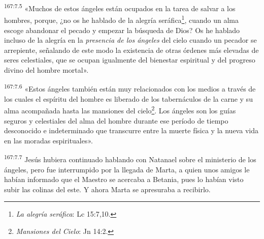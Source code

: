 \par
\textsuperscript{167:7.5} «Muchos de estos ángeles están ocupados en la tarea de salvar a los hombres, porque, ¿no os he hablado de la alegría seráfica\footnote{\textit{La alegría seráfica}: Lc 15:7,10.}, cuando un alma escoge abandonar el pecado y empezar la búsqueda de Dios? Os he hablado incluso de la alegría en la \textit{presencia de los ángeles} del cielo cuando un pecador se arrepiente, señalando de este modo la existencia de otras órdenes más elevadas de seres celestiales, que se ocupan igualmente del bienestar espiritual y del progreso divino del hombre mortal».

\par
\textsuperscript{167:7.6} «Estos ángeles también están muy relacionados con los medios a través de los cuales el espíritu del hombre es liberado de los tabernáculos de la carne y su alma acompañada hasta las mansiones del cielo\footnote{\textit{Mansiones del Cielo}: Jn 14:2.}. Los ángeles son los guías seguros y celestiales del alma del hombre durante ese período de tiempo desconocido e indeterminado que transcurre entre la muerte física y la nueva vida en las moradas espirituales».

\par
\textsuperscript{167:7.7} Jesús hubiera continuado hablando con Natanael sobre el ministerio de los ángeles, pero fue interrumpido por la llegada de Marta, a quien unos amigos le habían informado que el Maestro se acercaba a Betania, pues lo habían visto subir las colinas del este. Y ahora Marta se apresuraba a recibirlo.